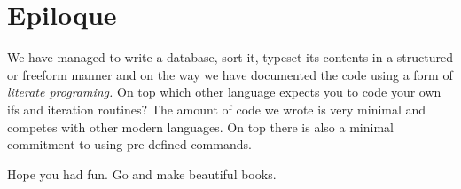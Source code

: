 \documentclass[crown]{octavo}
\begin{document}
\makeatother

\section{Epiloque}

We have managed to write a database, sort it, typeset its contents in a structured or freeform manner
and on the way we have documented the code using a form of \textit{literate programing.} On top which
other language expects you to code your own ifs and iteration routines? 
The amount of code we wrote is very minimal and competes with other modern languages. On top there is also a minimal commitment to using pre-defined commands.

Hope you had fun. Go and make beautiful
books.
\end{document}
